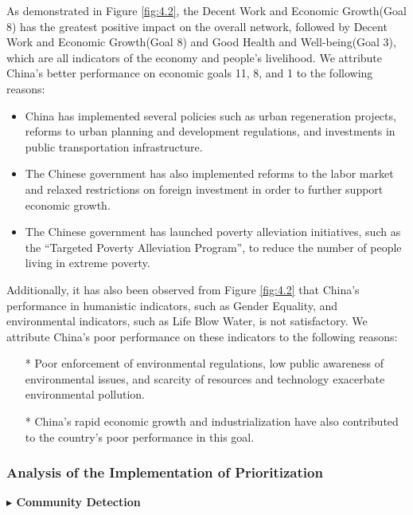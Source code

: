 \documentclass[12pt]{article}  %
\begin{document}
As demonstrated in Figure \ref{fig:4.2}, the Decent Work and Economic Growth(Goal 8) has the greatest positive impact on the overall network, followed by Decent Work and Economic Growth(Goal 8) and Good Health and Well-being(Goal 3), which are all indicators of the economy and people's livelihood.
We attribute China's better performance on economic goals 11, 8, and 1 to the following reasons:
\begin{itemize}
\setlength{\itemsep}{0pt}
\setlength{\parsep}{0pt}
\setlength{\parskip}{0pt}
    \item 
China has implemented several policies such as urban regeneration projects, reforms to urban planning and development regulations, and investments in public transportation infrastructure.
\item The Chinese government has also implemented reforms to the labor market and relaxed restrictions on foreign investment in order to further support economic growth.
\item The Chinese government has launched poverty alleviation initiatives, such as the “Targeted Poverty Alleviation Program”, to reduce the number of people living in extreme poverty.
\end{itemize}
Additionally, it has also been  observed from Figure \ref{fig:4.2} that China's performance in humanistic indicators, such as Gender Equality, and environmental indicators, such as Life Blow Water, is not satisfactory. 
We attribute China's poor performance on these indicators to the following reasons:
\begin{itemize}
   \setlength{\itemsep}{0pt}
\setlength{\parsep}{0pt}
\setlength{\parskip}{0pt}
\item[*] Poor enforcement of environmental regulations, low public awareness of environmental issues, and scarcity of resources and technology exacerbate environmental pollution.
\item[*] China's rapid economic growth and industrialization have also contributed to the country's poor performance in this goal. 
\end{itemize}

\subsubsection{Analysis of the Implementation of Prioritization}

\vspace{0.7mm}\begin{itshape}
\textbf{$\blacktriangleright$
Community Detection
}\end{itshape}
\end{document}
